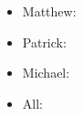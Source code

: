 \documentclass[12pt]{article}
\begin{document}
%
%
%

\begin{itemize}
    \item Matthew:
    \item Patrick:
    \item Michael:
    \item All:
\end{itemize}
\end{document}
